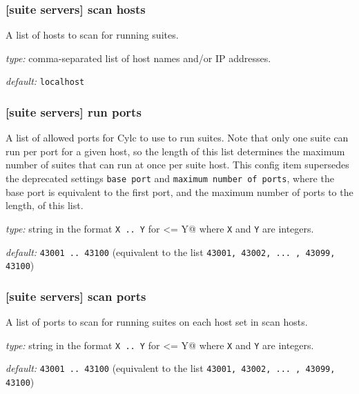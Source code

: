 \subsubsection[scan hosts]{[suite servers] \textrightarrow scan hosts }

A list of hosts to scan for running suites.

\begin{myitemize}
\item {\em type:} comma-separated list of host names and/or IP addresses.
\item {\em default:} \lstinline=localhost=
\end{myitemize}

\subsubsection[run ports]{[suite servers] \textrightarrow run ports }

A list of allowed ports for Cylc to use to run suites. Note that only one
suite can run per port for a given host, so the length of this list
determines the maximum number of suites that can run at once per suite host.
This config item supersedes the deprecated settings \lstinline=base port=
and \lstinline=maximum number of ports=, where the base port is equivalent to
the first port, and the maximum number of ports to the length, of this list.

\begin{myitemize}
\item {\em type:} string in the format \lstinline=X .. Y= for
 \lstinline@X <= Y@ where \lstinline=X= and \lstinline=Y= are integers.
\item {\em default:} \lstinline=43001 .. 43100= (equivalent to the list
\lstinline=43001, 43002, ... , 43099, 43100=)
\end{myitemize}

\subsubsection[scan ports]{[suite servers] \textrightarrow scan ports }

A list of ports to scan for running suites on each host set in scan hosts.

\begin{myitemize}
\item {\em type:} string in the format \lstinline=X .. Y= for
 \lstinline@X <= Y@ where \lstinline=X= and \lstinline=Y= are integers.
\item {\em default:} \lstinline=43001 .. 43100= (equivalent to the list
\lstinline=43001, 43002, ... , 43099, 43100=)
\end{myitemize}

